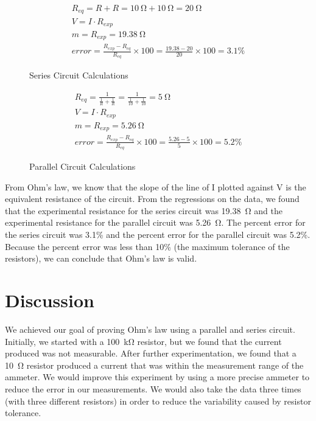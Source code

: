 \documentclass{article}
\begin{document}
\setlength{\jot}{10pt}
\begin{figure}
    \begin{gather}
        R_{eq} = R + R = \SI{10}{\ohm} + \SI{10}{\ohm} = \SI{20}{\ohm} \\
        V = I \cdot R_{exp} \\
        m = R_{exp} = \SI{19.38}{\ohm} \\
        error = \frac{R_{exp} - R_{eq}}{R_{eq}} \times 100 = \frac{19.38 - 20}{20} \times 100 = 3.1\%
    \end{gather}
    \caption{Series Circuit Calculations}
\end{figure}
\begin{figure}
    \begin{gather}
        R_{eq} = \frac{1}{\frac{1}{R} + \frac{1}{R}} = \frac{1}{\frac{1}{10} + \frac{1}{10}} = \SI{5}{\ohm} \\
        V = I \cdot R_{exp} \\
        m = R_{exp} = \SI{5.26}{\ohm} \\
        error = \frac{R_{exp} - R_{eq}}{R_{eq}} \times 100 = \frac{5.26 - 5}{5} \times 100 = 5.2\%
    \end{gather}
    \caption{Parallel Circuit Calculations}
\end{figure}

From Ohm's law, we know that the slope of the line of I plotted against V is
the equivalent resistance of the circuit. From the regressions on the data, we
found that the experimental resistance for the series circuit was
\SI{19.38}{\ohm} and the experimental resistance for the parallel circuit was
\SI{5.26}{\ohm}. The percent error for the series circuit was 3.1\% and the percent error for
the parallel circuit was 5.2\%. Because the percent error was less than 10\%
(the maximum tolerance of the resistors), we can conclude that Ohm's law is valid.

\section{Discussion}

We achieved our goal of proving Ohm's law using a parallel and series circuit.
Initially, we started with a \SI{100}{\kilo\ohm} resistor, but we found that
the current produced was not measurable. After further experimentation, we
found that a \SI{10}{\ohm} resistor produced a current that was within the
measurement range of the ammeter. We would improve this experiment by using a
more precise ammeter to reduce the error in our measurements. We would also
take the data three times (with three different resistors) in order to reduce
the variability caused by resistor tolerance.
\end{document}

